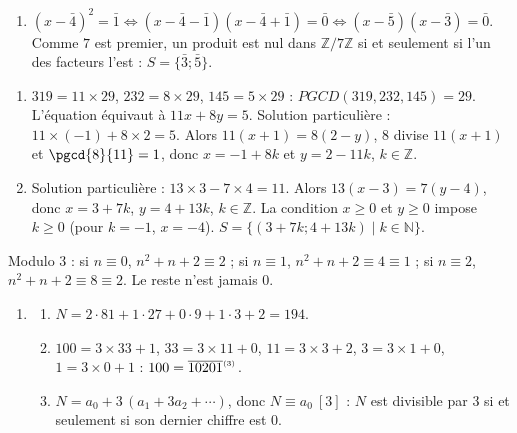 \begin{corrige}
\begin{sol}
\begin{enumerate}
\begin{enumerate}
            donc $(E) \iff (x - \bar{4})^2 = \bar{1}$.
      \item $(x-\bar{4})^2 = \bar{1} \iff (x - \bar{4} - \bar{1})(x - \bar{4} + \bar{1}) = \bar{0} \iff (x - \bar{5})(x - \bar{3}) = \bar{0}$.
            Comme $7$ est premier, un produit est nul dans $\mathbb{Z}/7\mathbb{Z}$ si et seulement si l'un des facteurs l'est :
            $S = \{ \bar{3} ; \bar{5} \}$.
      \end{enumerate}
\end{enumerate}
\end{sol}
%
\begin{sol}
\begin{enumerate}
\item $319 = 11 \times 29$, $232 = 8 \times 29$, $145 = 5 \times 29$ : $PGCD(319, 232, 145) = 29$.
      L'\'equation \'equivaut \`a $11x + 8y = 5$. Solution particuli\`ere : $11 \times (-1) + 8 \times 2 = 5$.
      Alors $11(x + 1) = 8(2 - y)$, $8$ divise $11(x+1)$ et $\pgcd{8}{11} = 1$, donc $x = -1 + 8k$ et $y = 2 - 11k$, $k \in \mathbb{Z}$.
\item Solution particuli\`ere : $13 \times 3 - 7 \times 4 = 11$. Alors $13(x - 3) = 7(y - 4)$, donc $x = 3 + 7k$, $y = 4 + 13k$, $k \in \mathbb{Z}$.
      La condition $x \geq 0$ et $y \geq 0$ impose $k \geq 0$ (pour $k = -1$, $x = -4$).
      $S = \{ (3 + 7k ; 4 + 13k) \mid k \in \mathbb{N} \}$.
\end{enumerate}
\end{sol}
%
\begin{sol}
Modulo $3$ : si $n \equiv 0$, $n^2 + n + 2 \equiv 2$ ; si $n \equiv 1$, $n^2 + n + 2 \equiv 4 \equiv 1$ ; si $n \equiv 2$, $n^2 + n + 2 \equiv 8 \equiv 2$.
Le reste n'est jamais $0$.
\end{sol}
%
\begin{sol}
\begin{enumerate}
\item \begin{enumerate}
      \item $N = 2 \cdot 81 + 1 \cdot 27 + 0 \cdot 9 + 1 \cdot 3 + 2 = 194$.
      \item $100 = 3 \times 33 + 1$, $33 = 3 \times 11 + 0$, $11 = 3 \times 3 + 2$, $3 = 3 \times 1 + 0$, $1 = 3 \times 0 + 1$ : $100 = \overline{10201}^{_{(3)}}$.
      \item $N = a_0 + 3\,(a_1 + 3a_2 + \cdots)$, donc $N \equiv a_0 \ [3]$ : $N$ est divisible par $3$ si et seulement si son dernier chiffre est $0$.

\end{enumerate}
\end{enumerate}
\end{sol}
\end{corrige}
